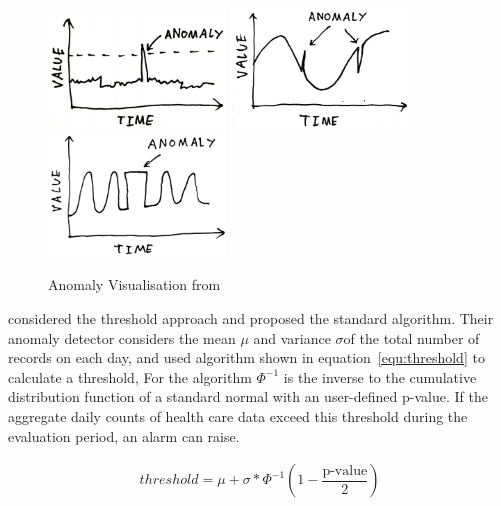 \begin{figure}[h]
	\includegraphics[width=47mm]{Figures/external/simple_anomaly}
	\includegraphics[width=47mm]{Figures/external/harder_anomaly}
	\includegraphics[width=47mm]{Figures/external/really_hard_anomaly}
	\caption{Anomaly Visualisation from \citet{Rahtz2015}}
	\label{fig:anomaly}
\end{figure}

\citet{wong2003bayesian} considered the threshold approach and proposed the standard algorithm. Their anomaly detector considers the mean $\mu$ and variance $\sigma$of the total number of records on each day, and used algorithm shown in equation~\ref{equ:threshold} to calculate a threshold, For the algorithm $\Phi^{-1}$ is the inverse to the cumulative distribution function of a standard normal with an user-defined p-value. If the aggregate daily counts of health care data exceed this threshold during the evaluation period, an alarm can raise. 

\begin{equation}\label{equ:threshold}
\begin{aligned}
threshold = \mu + \sigma * \Phi^{-1}(1-\dfrac{\text{p-value}}{2})
\end{aligned}
\end{equation}


